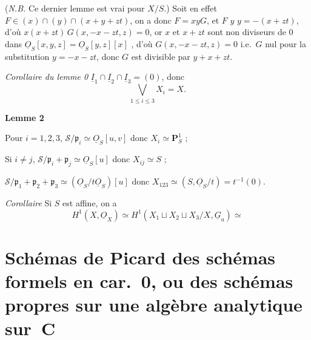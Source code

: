 \documentclass[11pt,a4paper]{article}
\begin{document}
(\emph{N.B.} Ce dernier lemme est vrai pour $X/S$.)
Soit en effet $F \in (x) \cap (y) \cap (x+y+zt)$, on a donc $F = xyG$, et
$F$   \ill{} $y$ 
$y = -(x+zt)$, d'où $x(x+zt)\,G(x,-x-zt,z) = 0$, or $x$ et $x+zt$ sont
non diviseurs de $0$ dans
$\underline{O}_S[x,y,z] = \underline{O}_S[y,z][x]$ \struck{\ill{}}, d'où
$G(x,-x-zt,z) = 0$ i.e.\ $G$  \struck{\ill{}} nul pour la
substitution $y = -x-zt$, donc $G$ est divisible par $y+x+zt$.

\emph{Corollaire du lemme 0} $\underline{I}_1 \cap \underline{I}_2 \cap \underline{I}_3 = (0)$, donc
\[
\bigvee_{1 \leqslant i \leqslant 3} X_i = X .
\]

\textbf{Lemme 2} 

Pour $i = 1,2,3$, $\mathcal{S}/\mathfrak{p}_i \simeq \underline{O}_S[u,v]$
donc $X_i \simeq \mathbf{P}^1_S$ ;

Si $i \neq j$, $\mathcal{S}/\mathfrak{p}_i + \mathfrak{p}_j \simeq \underline{O}_S[u]$
 donc $X_{ij} \simeq S$ ;

  $\mathcal{S}/\mathfrak{p}_1 + \mathfrak{p}_2 + \mathfrak{p}_3 \simeq (\underline{O}_S/t\underline{O}_S)[u]$
donc $X_{123} \simeq (S, \underline{O}_S/t) = t^{-1}(0)$.

\emph{Corollaire} Si $S$ est affine, on a
\[
H^1(X, \underline{O}_X) \simeq H^1(X_1 \sqcup X_2 \sqcup X_3 / X, \underline{G}_a) \simeq
\]

\section{Schémas de Picard des schémas formels en car.~0, ou des schémas propres sur une algèbre analytique sur~$\mathbf{C}$}

\end{document}
